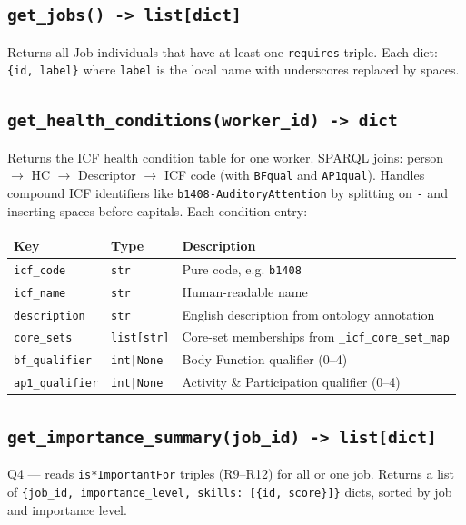 ﻿\documentclass[12pt,a4paper]{article}
\begin{document}
\subsection{\texttt{get\_jobs() -> list[dict]}}

Returns all Job individuals that have at least one \texttt{requires} triple. Each dict: \texttt{\{id, label\}} where \texttt{label} is the local name with underscores replaced by spaces.

\subsection{\texttt{get\_health\_conditions(worker\_id) -> dict}}

Returns the ICF health condition table for one worker. SPARQL joins: person $\to$ HC $\to$ Descriptor $\to$ ICF code (with \texttt{BFqual} and \texttt{AP1qual}). Handles compound ICF identifiers like \texttt{b1408-AuditoryAttention} by splitting on \texttt{-} and inserting spaces before capitals. Each condition entry:

\begin{longtable}{@{}P{3.5cm}P{2.5cm}P{8.5cm}@{}}
\toprule
\textbf{Key} & \textbf{Type} & \textbf{Description} \\
\midrule
\endhead
\texttt{icf\_code} & \texttt{str} & Pure code, e.g. \texttt{b1408} \\
\texttt{icf\_name} & \texttt{str} & Human-readable name \\
\texttt{description} & \texttt{str} & English description from ontology annotation \\
\texttt{core\_sets} & \texttt{list[str]} & Core-set memberships from \texttt{\_icf\_core\_set\_map} \\
\texttt{bf\_qualifier} & \texttt{int|None} & Body Function qualifier (0--4) \\
\texttt{ap1\_qualifier} & \texttt{int|None} & Activity \& Participation qualifier (0--4) \\
\bottomrule
\end{longtable}

\subsection{\texttt{get\_importance\_summary(job\_id) -> list[dict]}}

Q4 --- reads \texttt{is*ImportantFor} triples (R9--R12) for all or one job. Returns a list of \texttt{\{job\_id, importance\_level, skills: [\{id, score\}]\}} dicts, sorted by job and importance level.
\end{document}
